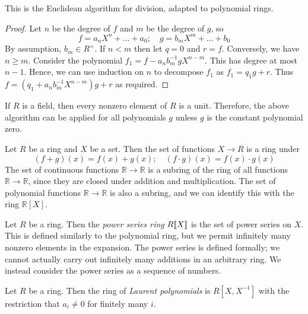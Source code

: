 \begin{remark}
	This is the Euclidean algorithm for division, adapted to polynomial rings.
\end{remark}
\begin{proof}
	Let \( n \) be the degree of \( f \) and \( m \) be the degree of \( g \), so
	\[
		f = a_n X^n + \dots + a_0;\quad g = b_m X^m + \dots + b_0
	\]
	By assumption, \( b_m \in R^\times \).
	If \( n < m \) then let \( q = 0 \) and \( r = f \).
	Conversely, we have \( n \geq m \).
	Consider the polynomial \( f_1 = f - a_n b_m^{-1} g X^{n-m} \).
	This has degree at most \( n - 1 \).
	Hence, we can use induction on \( n \) to decompose \( f_1 \) as \( f_1 = q_1 g + r \).
	Thus \( f = (q_1 + a_n b_m^{-1} X^{n-m}) g + r \) as required.
\end{proof}
\begin{remark}
	If \( R \) is a field, then every nonzero element of \( R \) is a unit.
	Therefore, the above algorithm can be applied for all polynomials \( g \) unless \( g \) is the constant polynomial zero.
\end{remark}
\begin{example}
	Let \( R \) be a ring and \( X \) be a set.
	Then the set of functions \( X \to R \) is a ring under
	\[
		(f + g)(x) = f(x) + g(x);\quad (f \cdot g)(x) = f(x) \cdot g(x)
	\]
	The set of continuous functions \( \mathbb R \to \mathbb R \) is a subring of the ring of all functions \( \mathbb R \to \mathbb R \), since they are closed under addition and multiplication.
	The set of polynomial functions \( \mathbb R \to \mathbb R \) is also a subring, and we can identify this with the ring \( \mathbb R[X] \).
\end{example}
\begin{example}
	Let \( R \) be a ring.
	Then the \textit{power series ring} \( R[\![X]\!] \) is the set of power series on \( X \).
	This is defined similarly to the polynomial ring, but we permit infinitely many nonzero elements in the expansion.
	The power series is defined formally; we cannot actually carry out infinitely many additions in an arbitrary ring.
	We instead consider the power series as a sequence of numbers.
\end{example}
\begin{example}
	Let \( R \) be a ring.
	Then the ring of \textit{Laurent polynomials} is \( R[X,X^{-1}] \) with the restriction that \( a_i \neq 0 \) for finitely many \( i \).
\end{example}

